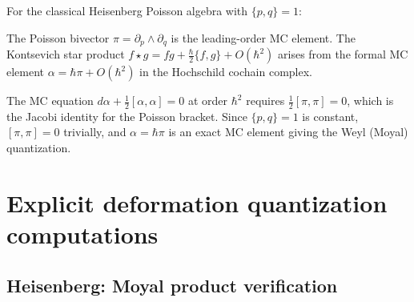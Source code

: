 \begin{computation}\label{comp:mc-coords}
For the classical Heisenberg Poisson algebra with $\{p, q\} = 1$:

The Poisson bivector $\pi = \partial_p \wedge \partial_q$ is the leading-order MC element. The Kontsevich star product $f \star g = fg + \frac{\hbar}{2}\{f,g\} + O(\hbar^2)$ arises from the formal MC element $\alpha = \hbar\pi + O(\hbar^2)$ in the Hochschild cochain complex.

The MC equation $d\alpha + \frac{1}{2}[\alpha, \alpha] = 0$ at order $\hbar^2$ requires $\frac{1}{2}[\pi, \pi] = 0$, which is the Jacobi identity for the Poisson bracket. Since $\{p,q\} = 1$ is constant, $[\pi,\pi] = 0$ trivially, and $\alpha = \hbar\pi$ is an exact MC element giving the Weyl (Moyal) quantization.
\end{computation}


\section{Explicit deformation quantization computations}
\label{sec:explicit-dq-computations}

\subsection{Heisenberg: Moyal product verification}

